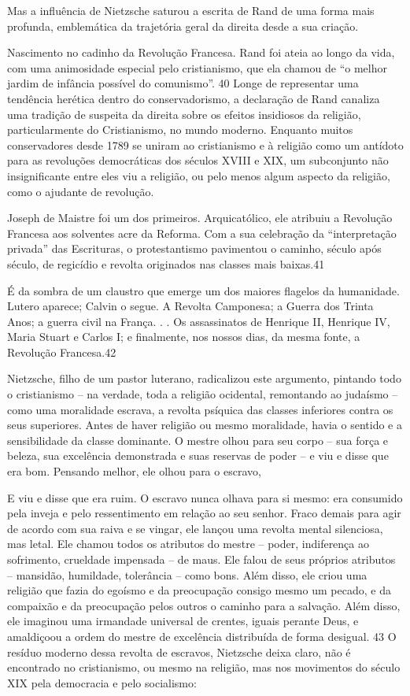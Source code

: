  \par 
Mas a influência de Nietzsche saturou a escrita de Rand de uma forma mais profunda, emblemática da trajetória geral da direita desde a sua criação.
 \par 
Nascimento no cadinho da Revolução Francesa. Rand foi ateia ao longo da vida, com uma animosidade especial pelo cristianismo, que ela chamou de “o melhor jardim de infância possível do comunismo”. {\color{blue}40} Longe de representar uma tendência herética dentro do conservadorismo, a declaração de Rand canaliza uma tradição de suspeita da direita sobre os efeitos insidiosos da religião, particularmente do Cristianismo, no mundo moderno. Enquanto muitos conservadores desde 1789 se uniram ao cristianismo e à religião como um antídoto para as revoluções democráticas dos séculos XVIII e XIX, um subconjunto não insignificante entre eles viu a religião, ou pelo menos algum aspecto da religião, como o ajudante de revolução.
 \par 
Joseph de Maistre foi um dos primeiros. Arquicatólico, ele atribuiu a Revolução Francesa aos solventes acre da Reforma. Com a sua celebração da “interpretação privada” das Escrituras, o protestantismo pavimentou o caminho, século após século, de regicídio e revolta originados nas classes mais baixas.{\color{blue}41}
 \par 
É da sombra de um claustro que emerge um dos maiores flagelos da humanidade. Lutero aparece; Calvin o segue. A Revolta Camponesa; a Guerra dos Trinta Anos; a guerra civil na França. . . Os assassinatos de Henrique II, Henrique IV, Maria Stuart e Carlos I; e finalmente, nos nossos dias, da mesma fonte, a Revolução Francesa.{\color{blue}42}
 \par 
Nietzsche, filho de um pastor luterano, radicalizou este argumento, pintando todo o cristianismo – na verdade, toda a religião ocidental, remontando ao judaísmo – como uma moralidade escrava, a revolta psíquica das classes inferiores contra os seus superiores. Antes de haver religião ou mesmo moralidade, havia o sentido e a sensibilidade da classe dominante. O mestre olhou para seu corpo – sua força e beleza, sua excelência demonstrada e suas reservas de poder – e viu e disse que era bom. Pensando melhor, ele olhou para o escravo,
 \par 
E viu e disse que era ruim. O escravo nunca olhava para si mesmo: era consumido pela inveja e pelo ressentimento em relação ao seu senhor. Fraco demais para agir de acordo com sua raiva e se vingar, ele lançou uma revolta mental silenciosa, mas letal. Ele chamou todos os atributos do mestre – poder, indiferença ao sofrimento, crueldade impensada – de maus. Ele falou de seus próprios atributos – mansidão, humildade, tolerância – como bons. Além disso, ele criou uma religião que fazia do egoísmo e da preocupação consigo mesmo um pecado, e da compaixão e da preocupação pelos outros o caminho para a salvação. Além disso, ele imaginou uma irmandade universal de crentes, iguais perante Deus, e amaldiçoou a ordem do mestre de excelência distribuída de forma desigual. {\color{blue}43} O resíduo moderno dessa revolta de escravos, Nietzsche deixa claro, não é encontrado no cristianismo, ou mesmo na religião, mas nos movimentos do século XIX pela democracia e pelo socialismo:
